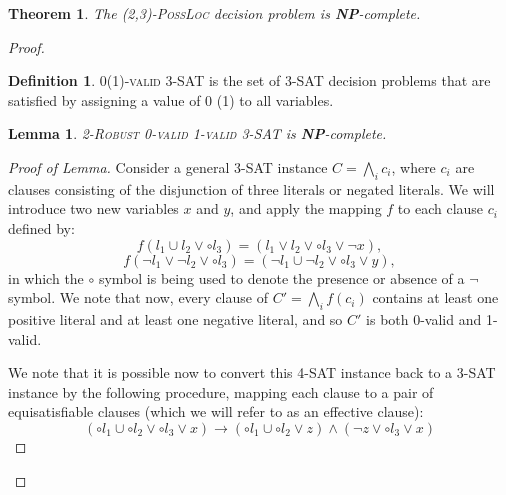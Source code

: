\documentclass[reprint]{revtex4-1}
\newtheorem{thm}{Theorem}
\newtheorem{lem}{Lemma}
\theoremstyle{definition}
\newtheorem{defn}{Definition}
\begin{document}
\begin{thm}
The \textsc{(2,3)-PossLoc} decision problem is \textbf{NP}-complete.
\end{thm}
\begin{proof}
\begin{defn}
\textsc{0(1)-valid 3-SAT} is the set of \textsc{3-SAT} decision problems that are satisfied by assigning a value of 0 (1) to all variables.
\end{defn}

\begin{lem}\label{rob3sat}
\textsc{2-Robust 0-valid 1-valid 3-SAT} is \textbf{NP}-complete.
\end{lem}
\begin{proof}[Proof of Lemma]
Consider a general \textsc{3-SAT} instance $C=\bigwedge_i c_i$, where $c_i$ are clauses consisting of the disjunction of three literals or negated literals. We will introduce two new variables $x$ and $y$, and apply the mapping $f$ to each clause $c_i$ defined by:
\begin{equation}
f(l_1\cup l_2 \vee  \circ  l_3) = (l_1\vee l_2 \vee \circ l_3 \vee \neg x),
\end{equation}
\begin{equation}
f(\neg l_1\vee\neg l_2 \vee \circ  l_3) = (\neg l_1\cup\neg l_2 \vee \circ  l_3 \vee  y),
\end{equation}
in which the $\circ$ symbol is being used to denote the presence or absence of a $\neg$ symbol. We note that now, every clause of $C'=\bigwedge_i f(c_i)$ contains at least one positive literal and at least one negative literal, and so $C'$ is both 0-valid and 1-valid.

We note that it is possible now to convert this 4-SAT instance back to a \textsc{3-SAT} instance by the following procedure, mapping each clause to a pair of equisatisfiable clauses (which we will refer to as an effective clause):
\begin{equation}
(\circ l_1\cup\circ l_2 \vee  \circ  l_3 \vee x) \rightarrow (\circ l_1\cup\circ l_2 \vee z)\wedge(\neg z \vee \circ  l_3 \vee x)
\end{equation}


\end{proof}
\end{proof}
\end{document}
